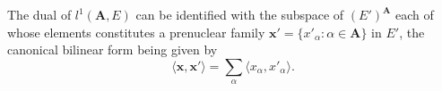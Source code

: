 The dual of $l^1(\mathbf{A}, E)$ can be identified with the subspace of $(E')^\mathbf{A}$ each of whose elements constitutes a prenuclear family $\mathbf{x}' = \{x'_\alpha : \alpha \in \mathbf{A}\}$ in $E'$, the canonical bilinear form being given by
$$\langle \mathbf{x}, \mathbf{x}' \rangle = \sum_\alpha \langle x_\alpha, x'_\alpha \rangle.$$
